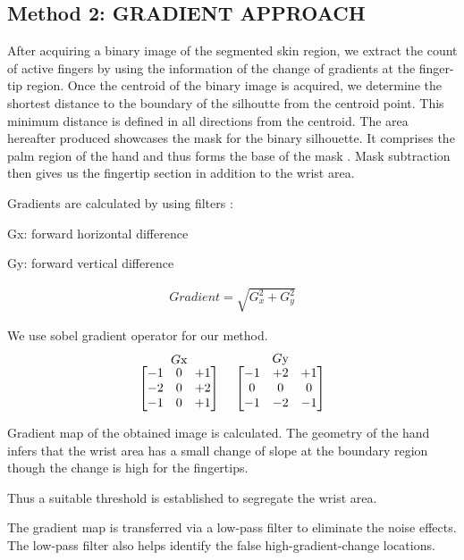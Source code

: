 \documentclass[conference]{IEEEtran}
\begin{document}
\subsection{Method 2: GRADIENT APPROACH}
After acquiring a binary image of the segmented skin region, we extract the count of active fingers by using the information of the change of gradients at the finger-tip region. Once the centroid of the binary image is acquired, we determine the shortest distance to the boundary of the silhoutte from the centroid point. This minimum distance is defined in all directions from the centroid. The area hereafter produced showcases the mask for the binary silhouette. It comprises the palm region of the hand and thus forms the base of the mask  \cite{6481804}. Mask subtraction then gives us the fingertip section in addition to the wrist area.

Gradients are calculated by using filters :

Gx: forward horizontal difference 

Gy: forward vertical difference

\begin{equation}
\begin{aligned}
Gradient = \sqrt{G_x^2 + G_y^2}
\end{aligned}
\end{equation}


We use sobel gradient operator for our method.
\[
  \stackrel{\mbox{$G$x}}{%
    \begin{bmatrix}
    -1 & 0 & +1 \\
    -2 & 0 & +2 \\
    -1 & 0 & +1
    \end{bmatrix}%
  }\ \quad
  \stackrel{\mbox{$G$y}}{%
    \begin{bmatrix}
    -1 & +2 & +1 \\
    0 & 0 & 0 \\
    -1 & -2 & -1
    \end{bmatrix}%
  }
\]


Gradient map of the obtained image is calculated. The geometry of the hand infers that the wrist area has a small change of slope at the boundary region though the change is high for the fingertips.

Thus a suitable threshold is established to segregate the wrist area.

The gradient map is transferred via a low-pass filter to eliminate the noise effects. The low-pass filter also helps identify the false high-gradient-change locations.
\end{document}
